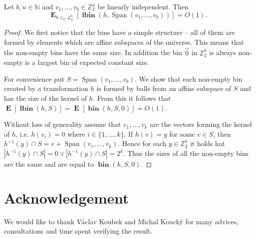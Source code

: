 \documentclass[unicode,review]{siamart1116}
\newcommand{\bin}[3]{\operatorname{\mathbf{bin}}({#1}, {#2}, {#3})}
\newcommand{\lbin}[2]{\operatorname{\mathbf{lbin}}({#1}, {#2})}
\newcommand{\vecspace}[2]{\mathbb{Z}_{#1}^{#2}}
\newcommand{\binvecspace}[1]{\vecspace{2}{#1}}
\newcommand{\linearmaps}[2]{\mathcal{L}_{#1}^{#2}}
\newcommand{\expects}[2]{\operatorname{\mathbf{E}}_{{#1}}\left[{#2}\right]}
\newcommand{\expect}[1]{\expects{}{#1}}
\numberwithin{theorem}{section}
\begin{document}
\begin{theorem}
Let $b, u \in \mathbb{N}$ and $v_1, \dots, v_b \in \mathbb{Z}_2^u$ be linearly independent. Then \[ \expects{h \in_U \linearmaps{u}{b}}{\lbin{h}{\operatorname{Span}(v_1, \dots, v_b)}} = O(1) .\]
\end{theorem}
\begin{proof}
We first notice that the bins have a simple structure -- all of them are formed by elements which are affine subspaces of the universe.
This means that the non-empty bins have the same size.
In addition the bin $\vec{0}$ in $\binvecspace{b}$ is always non-empty is a largest bin of expected constant size.

For convenience put $S = \operatorname{Span}(v_1, \dots, v_b)$. 
We show that each non-empty bin created by a transformation $h$ is formed by balls from an affine subspace of $S$ and has the size of the kernel of $h$.
From this it follows that $\expect{\lbin{h}{S}} = \expect{\bin{h}{S}{0}} = O(1)$.

Without loss of generality assume that $v_1, \dots, v_k$ are the vectors forming the kernel of $h$, i.e. $h(v_i) = 0$ where $i \in \{1, \dots, k\}$.
If $h(v) = y$ for some $v \in S$, then $h^{-1}(y) \cap S = v + \operatorname{Span}(v_1, \dots, v_k)$.
Hence for each $y \in \mathbb{Z}_2^b$ it holds hat $|h^{-1}(y) \cap S| = 0 \vee |h^{-1}(y) \cap S| = 2^k$.
Thus the sizes of all the non-empty bins are the same and are equal to $\bin{h}{S}{0}$.
\end{proof}

\section{Acknowledgement}

We would like to thank V\'aclav Koubek and Michal Kouck\'y for many advices, consultations and time spent verifying the result. 



\end{document}
